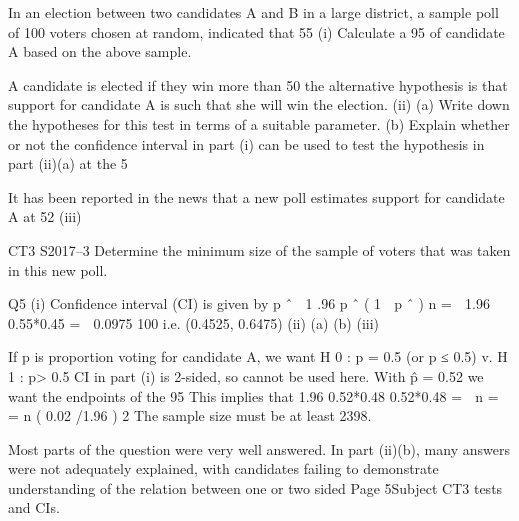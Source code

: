 \documentclass[a4paper,12pt]{article}
\begin{document}
In an election between two candidates A and B in a large district, a sample poll of 100
voters chosen at random, indicated that 55%
(i)
Calculate a 95%
of candidate A based on the above sample.

A candidate is elected if they win more than 50%
the alternative hypothesis is that support for candidate A is such that she will win the
election.
(ii)
(a) Write down the hypotheses for this test in terms of a suitable
parameter.
(b) Explain whether or not the confidence interval in part (i) can be used to
test the hypothesis in part (ii)(a) at the 5%

It has been reported in the news that a new poll estimates support for candidate A at
52%
(iii)

CT3 S2017–3
Determine the minimum size of the sample of voters that was taken in this
new poll.



Q5
(i)
Confidence interval (CI) is given by
p ˆ  1 .96
p ˆ ( 1  p ˆ )
n
\;=  1.96
0.55*0.45
\;=  0.0975
100
i.e. (0.4525, 0.6475)
(ii)
(a)
(b)
(iii)

If p is proportion voting for candidate A, we want
H 0 : p = 0.5 (or p ≤ 0.5) v. H 1 : p> 0.5 
CI in part (i) is 2-sided, so cannot be used here. 
With p̂ = 0.52 we want the endpoints of the 95%
This implies that
1.96
0.52*0.48
0.52*0.48
\;=  n \;=\;
\;=
n
( 0.02 /1.96 ) 2
The sample size must be at least 2398.

Most parts of the question were very well answered. In part (ii)(b),
many answers were not adequately explained, with candidates failing
to demonstrate understanding of the relation between one or two sided
Page 5Subject CT3 %
tests and CIs.
\end{document}
